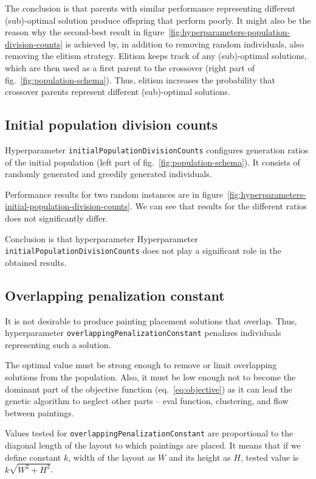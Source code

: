 The conclusion is that parents with similar performance representing different (sub)-optimal solution
produce offspring that perform poorly.
It might also be the reason why the second-best result in figure~\ref{fig:hyperparameters-population-division-counts}
is achieved by, in addition to removing random individuals, also removing the elitism strategy.
Elitism keeps track of any (sub)-optimal solutions, which are then used as a first parent
to the crossover (right part of fig.~\ref{fig:population-schema}).
Thus, elitism increases the probability that crossover parents represent different (sub)-optimal solutions.

\subsection{Initial population division counts}\label{subsec:initial-population-division-counts}
Hyperparameter \verb|initialPopulationDivisionCounts| configures generation ratios of the initial population (left part of fig.~\ref{fig:population-schema}).
It consists of randomly generated and greedily generated individuals.

Performance results for two random instances are in figure~\ref{fig:hyperparameters-initial-population-division-counts}.
We can see that results for the different ratios does not significantly differ.

Conclusion is that hyperparameter Hyperparameter \verb|initialPopulationDivisionCounts| does not play a significant role in the obtained results.

\subsection{Overlapping penalization constant}\label{subsec:overlapping-penalization-constant}

It is not desirable to produce painting placement solutions that overlap.
Thus, hyperparameter \verb|overlappingPenalizationConstant| penalizes
individuals representing such a solution.

The optimal value must be strong enough to remove or limit overlapping solutions from the population.
Also, it must be low enough not to become the dominant part of the objective function (eq.~\ref{eq:objective})
as it can lead the genetic algorithm to neglect other parts – eval function, clustering, and flow between paintings.

Values tested for \verb|overlappingPenalizationConstant| are proportional to the diagonal
length of the layout to which paintings are placed.
It means that if we define constant $k$, width of the layout as $W$ and its height as $H$,
tested value is $k\sqrt{W^2 + H^2}$.

